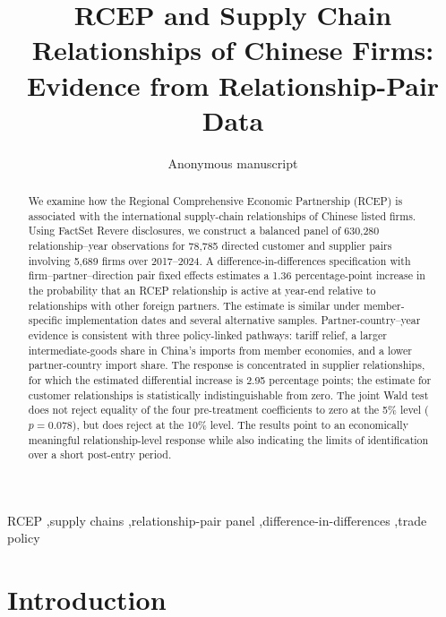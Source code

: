 \documentclass[preprint,12pt,authoryear]{elsarticle}
\begin{document}
\begin{frontmatter}

\title{RCEP and Supply Chain Relationships of Chinese Firms: Evidence from Relationship-Pair Data}

\author{Anonymous manuscript}

\begin{abstract}
We examine how the Regional Comprehensive Economic Partnership (RCEP) is associated with the international supply-chain relationships of Chinese listed firms. Using FactSet Revere disclosures, we construct a balanced panel of 630,280 relationship--year observations for 78,785 directed customer and supplier pairs involving 5,689 firms over 2017--2024. A difference-in-differences specification with firm--partner--direction pair fixed effects estimates a 1.36 percentage-point increase in the probability that an RCEP relationship is active at year-end relative to relationships with other foreign partners. The estimate is similar under member-specific implementation dates and several alternative samples. Partner-country--year evidence is consistent with three policy-linked pathways: tariff relief, a larger intermediate-goods share in China's imports from member economies, and a lower partner-country import share. The response is concentrated in supplier relationships, for which the estimated differential increase is 2.95 percentage points; the estimate for customer relationships is statistically indistinguishable from zero. The joint Wald test does not reject equality of the four pre-treatment coefficients to zero at the 5\% level ($p=0.078$), but does reject at the 10\% level. The results point to an economically meaningful relationship-level response while also indicating the limits of identification over a short post-entry period.
\end{abstract}

\begin{keyword}
RCEP \sep supply chains \sep relationship-pair panel \sep difference-in-differences \sep trade policy
\end{keyword}

\end{frontmatter}

\section{Introduction}
\label{sec:introduction}
\end{document}
